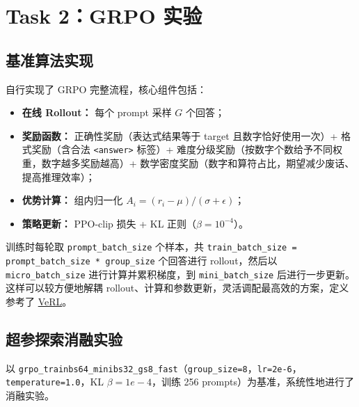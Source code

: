 \documentclass[UTF8,a4paper,10pt,twocolumn]{ctexart}
\begin{document}
\section{Task 2：GRPO 实验}

\subsection{基准算法实现}

自行实现了 GRPO 完整流程，核心组件包括：
\begin{itemize}
  \item \textbf{在线 Rollout：} 每个 prompt 采样 $G$ 个回答；
  \item \textbf{奖励函数：} 正确性奖励（表达式结果等于 target 且数字恰好使用一次）+ 格式奖励（含合法 \texttt{<answer>} 标签）+ 难度分级奖励（按数字个数给予不同权重，数字越多奖励越高）+ 数学密度奖励（数字和算符占比，期望减少废话、提高推理效率）；
  \item \textbf{优势计算：} 组内归一化 $A_i = (r_i - \mu) / (\sigma + \epsilon)$；
  \item \textbf{策略更新：} PPO-clip 损失 + KL 正则（$\beta = 10^{-4}$）。
\end{itemize}

训练时每轮取 \texttt{prompt\_batch\_size} 个样本，共 \texttt{train\_batch\_size = prompt\_batch\_size * group\_size} 个回答进行 rollout，然后以 \texttt{micro\_batch\_size} 进行计算并累积梯度，到 \texttt{mini\_batch\_size} 后进行一步更新。这样可以较方便地解耦 rollout、计算和参数更新，灵活调配最高效的方案，定义参考了 \href{https://github.com/verl-project/verl/}{VeRL}。

\subsection{超参探索消融实验}

以 \texttt{grpo\_trainbs64\_minibs32\_gs8\_fast}（\texttt{group\_size=8}，\texttt{lr=2e-6}，\texttt{temperature=1.0}，KL $\beta = 1e-4$，训练 256 prompts）为基准，系统性地进行了消融实验。
\end{document}
